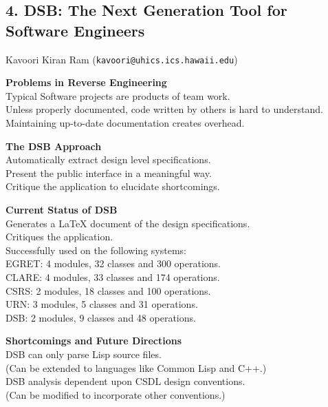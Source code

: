 \subsection*{4. DSB: The Next Generation Tool for Software Engineers}
Kavoori Kiran Ram ({\tt kavoori@uhics.ics.hawaii.edu})
\begin{itemizenoindent}

\item {\bf Problems in Reverse Engineering }\\
 Typical Software projects are products of team work.\\
 Unless properly documented, code written by others is hard to understand.\\
 Maintaining up-to-date documentation creates overhead.

\item  {\bf The DSB Approach}\\
 Automatically extract design level specifications.\\
 Present the public interface in a meaningful way.\\
 Critique the application to elucidate shortcomings.\\

\item {\bf Current Status of DSB}\\
 Generates a LaTeX document of the design specifications.\\
 Critiques the application.\\
 Successfully used on the following systems:\\
\indent    EGRET: 4 modules, 32 classes and 300 operations.\\
\indent    CLARE: 4 modules, 33 classes and 174 operations.\\
\indent    CSRS: 2 modules, 18 classes and 100 operations.\\
\indent    URN: 3 modules, 5 classes and 31 operations. \\
\indent    DSB: 2 modules, 9 classes and 48 operations.\\

\item {\bf Shortcomings and Future Directions}\\
 DSB can only parse Lisp source files.\\
 (Can be extended to languages like Common Lisp and C++.)\\
 DSB analysis dependent upon CSDL design conventions. \\
 (Can be modified to incorporate other conventions.)

\end{itemizenoindent}

\nocite{csdl-92-01,csdl-92-03,csdl-92-04,csdl-92-07,csdl-93-01,csdl-93-02,csdl-93-03,csdl-93-04,csdl-93-05,csdl-93-06}






